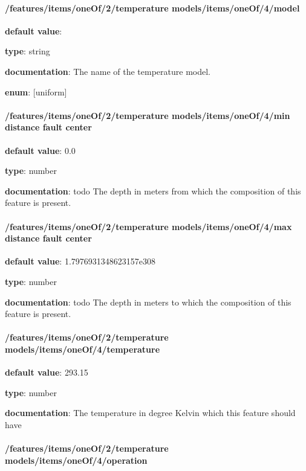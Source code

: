 \paragraph{/features/items/oneOf/2/temperature models/items/oneOf/4/model} \begin{itemized}
\item {\bf default value}: 
\item {\bf type}: string
\item {\bf documentation}: The name of the temperature model.
\item {\bf enum}: [uniform]\end{itemized}\paragraph{/features/items/oneOf/2/temperature models/items/oneOf/4/min distance fault center} \begin{itemized}
\item {\bf default value}: 0.0
\item {\bf type}: number
\item {\bf documentation}: todo The depth in meters from which the composition of this feature is present.
\end{itemized}\paragraph{/features/items/oneOf/2/temperature models/items/oneOf/4/max distance fault center} \begin{itemized}
\item {\bf default value}: 1.7976931348623157e308
\item {\bf type}: number
\item {\bf documentation}: todo The depth in meters to which the composition of this feature is present.
\end{itemized}\paragraph{/features/items/oneOf/2/temperature models/items/oneOf/4/temperature} \begin{itemized}
\item {\bf default value}: 293.15
\item {\bf type}: number
\item {\bf documentation}: The temperature in degree Kelvin which this feature should have
\end{itemized}\paragraph{/features/items/oneOf/2/temperature models/items/oneOf/4/operation} \begin{itemized}

\end{itemized}
